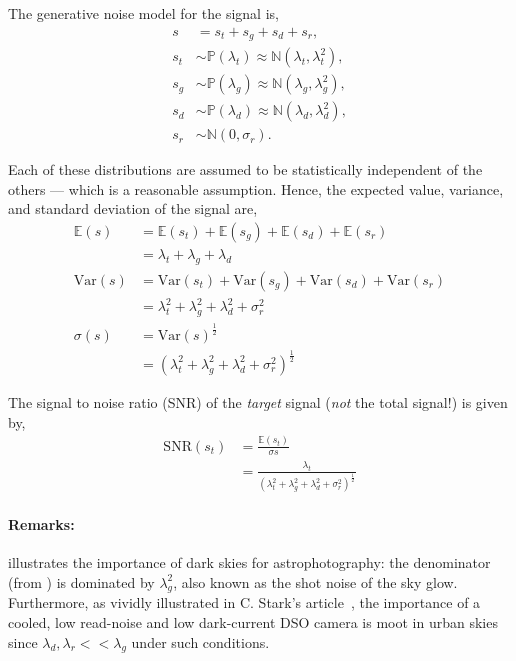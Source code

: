 \documentclass[biblatex]{lni}
\newcommand{\eqlabel}[1]{\label{eq:#1}}
\let\eqref\undefined
\newcommand{\eqref}[1]{Eq.~\ref{eq:#1}}
\newcommand{\poisson}[1]{\ensuremath{\mathds{P}(#1)}}
\newcommand{\normal}[2]{\ensuremath{\mathds{N}(#1,#2)}}
\newcommand{\E}[1]{\ensuremath{\mathds{E}(#1)}}
\newcommand{\Var}[1]{\ensuremath{\mathrm{Var}(#1)}}
\begin{document}
The generative noise model for the signal is,
\begin{align}
    s &= s_t + s_g + s_d + s_r, \\
    s_t &\sim \poisson{\lambda_t} \approx \normal{\lambda_t}{\lambda_t^2}, \\
    s_g &\sim \poisson{\lambda_g} \approx \normal{\lambda_g}{\lambda_g^2}, \\
    s_d &\sim \poisson{\lambda_d} \approx \normal{\lambda_d}{\lambda_d^2}, \\
    s_r &\sim \normal{0}{\sigma_r}.
\end{align}

Each of these distributions are assumed to be statistically independent of the others --- which is a reasonable assumption. Hence, the expected value, variance, and standard deviation of the signal are,
\begin{align}
    \E{s} &= \E{s_t} + \E{s_g} + \E{s_d} + \E{s_r} \\
    &= \lambda_t + \lambda_g + \lambda_d\\
    \Var{s} &= \Var{s_t} + \Var{s_g} + \Var{s_d} + \Var{s_r}\\
    &= \lambda_t^2 + \lambda_g^2 + \lambda_d^2 + \sigma_r^2\\
    \sigma(s) &= \Var{s}^\frac{1}{2}\\
    &= \left(\lambda_t^2 + \lambda_g^2 + \lambda_d^2 + \sigma_r^2\right)^\frac{1}{2} \eqlabel{total_sigma}
\end{align}

The signal to noise ratio (SNR) of the \emph{target} signal (\emph{not} the total signal!) is given by,
\begin{align}
    \mathrm{SNR}(s_t) &= \frac{\E{s_t}}{\sigma{s}} \\
    &= \frac{\lambda_t}{\left(\lambda_t^2 + \lambda_g^2 + \lambda_d^2 + \sigma_r^2\right)^\frac{1}{2}} \eqlabel{snr}
\end{align}
\paragraph{Remarks:} \eqref{snr} illustrates the importance of dark skies for astrophotography: the denominator (from \eqref{total_sigma}) is dominated by $\lambda_g^2$, also known as the shot noise of the sky glow. Furthermore, as vividly illustrated in C. Stark's article~\cite{stark2009signal2}, the importance of a cooled, low read-noise and low dark-current DSO camera is moot in urban skies since $\lambda_d, \lambda_r << \lambda_g$ under such conditions. 

\printbibliography
\end{document}

